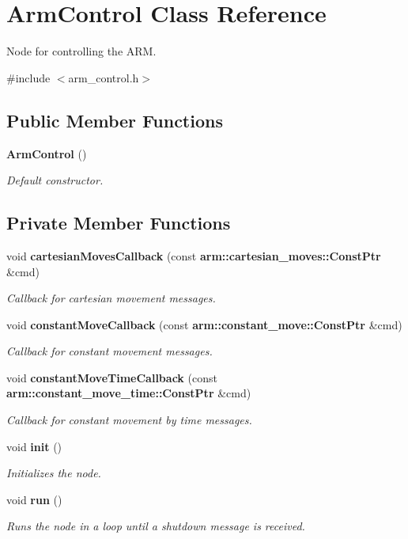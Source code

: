 \section{\-Arm\-Control \-Class \-Reference}
\label{classArmControl}


\-Node for controlling the \-A\-R\-M.  




{\ttfamily \#include $<$arm\-\_\-control.\-h$>$}

\subsection*{\-Public \-Member \-Functions}
\begin{DoxyCompactItemize}
\item 
{\bf \-Arm\-Control} ()
\begin{DoxyCompactList}\small\item\em \-Default constructor. \end{DoxyCompactList}\end{DoxyCompactItemize}
\subsection*{\-Private \-Member \-Functions}
\begin{DoxyCompactItemize}
\item 
void {\bf cartesian\-Moves\-Callback} (const {\bf arm\-::cartesian\-\_\-moves\-::\-Const\-Ptr} \&cmd)
\begin{DoxyCompactList}\small\item\em \-Callback for cartesian movement messages. \end{DoxyCompactList}\item 
void {\bf constant\-Move\-Callback} (const {\bf arm\-::constant\-\_\-move\-::\-Const\-Ptr} \&cmd)
\begin{DoxyCompactList}\small\item\em \-Callback for constant movement messages. \end{DoxyCompactList}\item 
void {\bf constant\-Move\-Time\-Callback} (const {\bf arm\-::constant\-\_\-move\-\_\-time\-::\-Const\-Ptr} \&cmd)
\begin{DoxyCompactList}\small\item\em \-Callback for constant movement by time messages. \end{DoxyCompactList}\item 
void {\bf init} ()
\begin{DoxyCompactList}\small\item\em \-Initializes the node. \end{DoxyCompactList}\item 
void {\bf run} ()
\begin{DoxyCompactList}\small\item\em \-Runs the node in a loop until a shutdown message is received. \end{DoxyCompactList}\end{DoxyCompactItemize}
